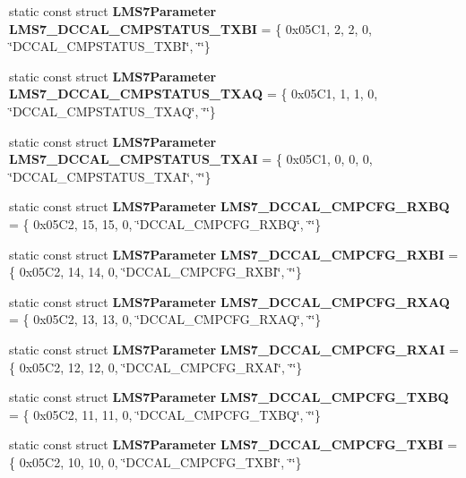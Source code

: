 \begin{DoxyCompactItemize}
\item 
static const struct {\bf L\+M\+S7\+Parameter} {\bf L\+M\+S7\+\_\+\+D\+C\+C\+A\+L\+\_\+\+C\+M\+P\+S\+T\+A\+T\+U\+S\+\_\+\+T\+X\+BI} = \{ 0x05\+C1, 2, 2, 0, \char`\"{}\+D\+C\+C\+A\+L\+\_\+\+C\+M\+P\+S\+T\+A\+T\+U\+S\+\_\+\+T\+X\+B\+I\char`\"{}, \char`\"{}\char`\"{}\}
\item 
static const struct {\bf L\+M\+S7\+Parameter} {\bf L\+M\+S7\+\_\+\+D\+C\+C\+A\+L\+\_\+\+C\+M\+P\+S\+T\+A\+T\+U\+S\+\_\+\+T\+X\+AQ} = \{ 0x05\+C1, 1, 1, 0, \char`\"{}\+D\+C\+C\+A\+L\+\_\+\+C\+M\+P\+S\+T\+A\+T\+U\+S\+\_\+\+T\+X\+A\+Q\char`\"{}, \char`\"{}\char`\"{}\}
\item 
static const struct {\bf L\+M\+S7\+Parameter} {\bf L\+M\+S7\+\_\+\+D\+C\+C\+A\+L\+\_\+\+C\+M\+P\+S\+T\+A\+T\+U\+S\+\_\+\+T\+X\+AI} = \{ 0x05\+C1, 0, 0, 0, \char`\"{}\+D\+C\+C\+A\+L\+\_\+\+C\+M\+P\+S\+T\+A\+T\+U\+S\+\_\+\+T\+X\+A\+I\char`\"{}, \char`\"{}\char`\"{}\}
\item 
static const struct {\bf L\+M\+S7\+Parameter} {\bf L\+M\+S7\+\_\+\+D\+C\+C\+A\+L\+\_\+\+C\+M\+P\+C\+F\+G\+\_\+\+R\+X\+BQ} = \{ 0x05\+C2, 15, 15, 0, \char`\"{}\+D\+C\+C\+A\+L\+\_\+\+C\+M\+P\+C\+F\+G\+\_\+\+R\+X\+B\+Q\char`\"{}, \char`\"{}\char`\"{}\}
\item 
static const struct {\bf L\+M\+S7\+Parameter} {\bf L\+M\+S7\+\_\+\+D\+C\+C\+A\+L\+\_\+\+C\+M\+P\+C\+F\+G\+\_\+\+R\+X\+BI} = \{ 0x05\+C2, 14, 14, 0, \char`\"{}\+D\+C\+C\+A\+L\+\_\+\+C\+M\+P\+C\+F\+G\+\_\+\+R\+X\+B\+I\char`\"{}, \char`\"{}\char`\"{}\}
\item 
static const struct {\bf L\+M\+S7\+Parameter} {\bf L\+M\+S7\+\_\+\+D\+C\+C\+A\+L\+\_\+\+C\+M\+P\+C\+F\+G\+\_\+\+R\+X\+AQ} = \{ 0x05\+C2, 13, 13, 0, \char`\"{}\+D\+C\+C\+A\+L\+\_\+\+C\+M\+P\+C\+F\+G\+\_\+\+R\+X\+A\+Q\char`\"{}, \char`\"{}\char`\"{}\}
\item 
static const struct {\bf L\+M\+S7\+Parameter} {\bf L\+M\+S7\+\_\+\+D\+C\+C\+A\+L\+\_\+\+C\+M\+P\+C\+F\+G\+\_\+\+R\+X\+AI} = \{ 0x05\+C2, 12, 12, 0, \char`\"{}\+D\+C\+C\+A\+L\+\_\+\+C\+M\+P\+C\+F\+G\+\_\+\+R\+X\+A\+I\char`\"{}, \char`\"{}\char`\"{}\}
\item 
static const struct {\bf L\+M\+S7\+Parameter} {\bf L\+M\+S7\+\_\+\+D\+C\+C\+A\+L\+\_\+\+C\+M\+P\+C\+F\+G\+\_\+\+T\+X\+BQ} = \{ 0x05\+C2, 11, 11, 0, \char`\"{}\+D\+C\+C\+A\+L\+\_\+\+C\+M\+P\+C\+F\+G\+\_\+\+T\+X\+B\+Q\char`\"{}, \char`\"{}\char`\"{}\}
\item 
static const struct {\bf L\+M\+S7\+Parameter} {\bf L\+M\+S7\+\_\+\+D\+C\+C\+A\+L\+\_\+\+C\+M\+P\+C\+F\+G\+\_\+\+T\+X\+BI} = \{ 0x05\+C2, 10, 10, 0, \char`\"{}\+D\+C\+C\+A\+L\+\_\+\+C\+M\+P\+C\+F\+G\+\_\+\+T\+X\+B\+I\char`\"{}, \char`\"{}\char`\"{}\}

\end{DoxyCompactItemize}
